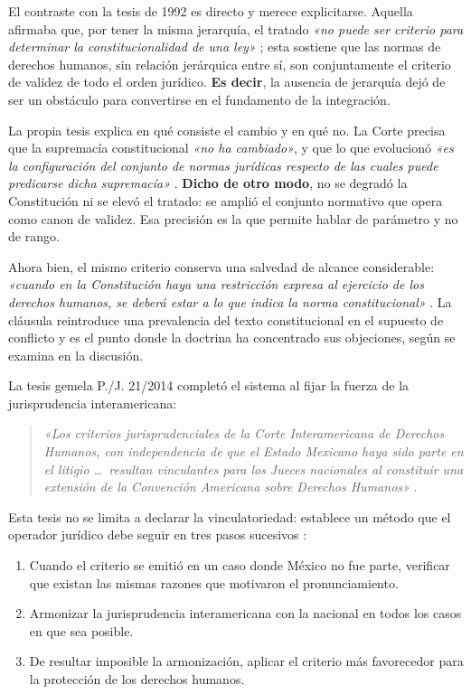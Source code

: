 \documentclass[
  spanish,
  letterpaper, oneside
]{article}
\begin{document}
El contraste con la tesis de 1992 es directo y merece explicitarse. Aquella afirmaba que, por tener la misma jerarquía, el tratado \textit{«no puede ser criterio para determinar la constitucionalidad de una ley»} \citep{scjnTesis205596}; esta sostiene que las normas de derechos humanos, sin relación jerárquica entre sí, son conjuntamente el criterio de validez de todo el orden jurídico. \textbf{Es decir}, la ausencia de jerarquía dejó de ser un obstáculo para convertirse en el fundamento de la integración.

La propia tesis explica en qué consiste el cambio y en qué no. La Corte precisa que la supremacía constitucional \textit{«no ha cambiado»}, y que lo que evolucionó \textit{«es la configuración del conjunto de normas jurídicas respecto de las cuales puede predicarse dicha supremacía»} \citep{scjnTesis2006224}. \textbf{Dicho de otro modo}, no se degradó la Constitución ni se elevó el tratado: se amplió el conjunto normativo que opera como canon de validez. Esa precisión es la que permite hablar de parámetro y no de rango.

Ahora bien, el mismo criterio conserva una salvedad de alcance considerable: \textit{«cuando en la Constitución haya una restricción expresa al ejercicio de los derechos humanos, se deberá estar a lo que indica la norma constitucional»} \citep{scjnTesis2006224}. La cláusula reintroduce una prevalencia del texto constitucional en el supuesto de conflicto y es el punto donde la doctrina ha concentrado sus objeciones, según se examina en la discusión.

La tesis gemela P./J. 21/2014 completó el sistema al fijar la fuerza de la jurisprudencia interamericana:

\begin{quote}
\textit{«Los criterios jurisprudenciales de la Corte Interamericana de Derechos Humanos, con independencia de que el Estado Mexicano haya sido parte en el litigio \dots\ resultan vinculantes para los Jueces nacionales al constituir una extensión de la Convención Americana sobre Derechos Humanos»} \citep[tesis P./J. 21/2014]{scjnTesis2006225}.
\end{quote}

Esta tesis no se limita a declarar la vinculatoriedad: establece un método que el operador jurídico debe seguir en tres pasos sucesivos \citep{scjnTesis2006225}:

\begin{enumerate}
  \item Cuando el criterio se emitió en un caso donde México no fue parte, verificar que existan las mismas razones que motivaron el pronunciamiento.
  \item Armonizar la jurisprudencia interamericana con la nacional en todos los casos en que sea posible.
  \item De resultar imposible la armonización, aplicar el criterio más favorecedor para la protección de los derechos humanos.
\end{enumerate}
\end{document}
